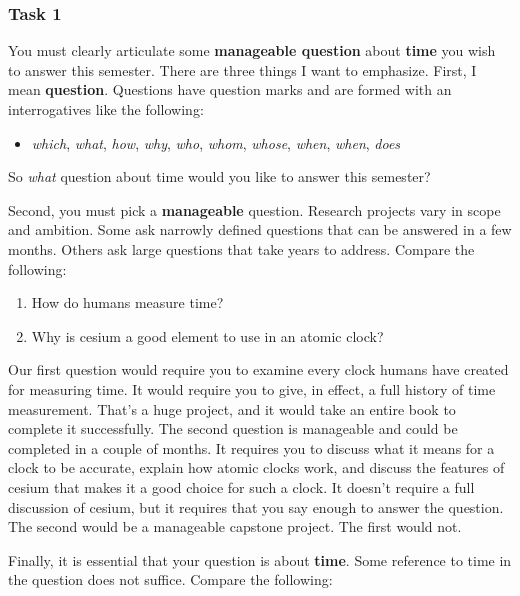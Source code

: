 \documentclass[]{article}
\providecommand{\tightlist}{%
  \setlength{\itemsep}{0pt}\setlength{\parskip}{0pt}}
\begin{document}
\hypertarget{task-1}{%
\subsubsection{Task 1}\label{task-1}}

You must clearly articulate some \textbf{manageable question} about
\textbf{time} you wish to answer this semester. There are three things I
want to emphasize. First, I mean \textbf{question}. Questions have question marks and are formed with an
interrogatives like the following:

\begin{itemize}
\tightlist
\item
  \emph{which}, \emph{what}, 
  \emph{how},  \emph{why},   \emph{who}, \emph{whom}, \emph{whose}, 
  \emph{when},  \emph{when},  \emph{does}
\end{itemize}

So \emph{what} question about time would you like to answer this
semester?

Second, you must pick a \textbf{manageable} question. Research projects
vary in scope and ambition. Some ask narrowly defined questions that can
be answered in a few months. Others ask large questions that take years
to address. Compare the following:

\begin{enumerate}
\def\labelenumi{\arabic{enumi}.}
\tightlist
\item
  How do humans measure time?\\
\item
  Why is cesium a good element to use in an atomic clock?
\end{enumerate}

Our first question would require you to examine every clock humans have
created for measuring time. It would require you to give, in effect, a
full history of time measurement. That's a huge project, and it would
take an entire book to complete it successfully. The second question is
manageable and could be completed in a couple of months. It requires you
to discuss what it means for a clock to be accurate, explain how atomic
clocks work, and discuss the features of cesium that makes it a good
choice for such a clock. It doesn't require a full discussion of cesium,
but it requires that you say enough to answer the question. The second would be a
manageable capstone project. The first would not.

Finally, it is essential that your question is about
\textbf{time}. Some reference to time in the question does not suffice.
Compare the following:
\end{document}
